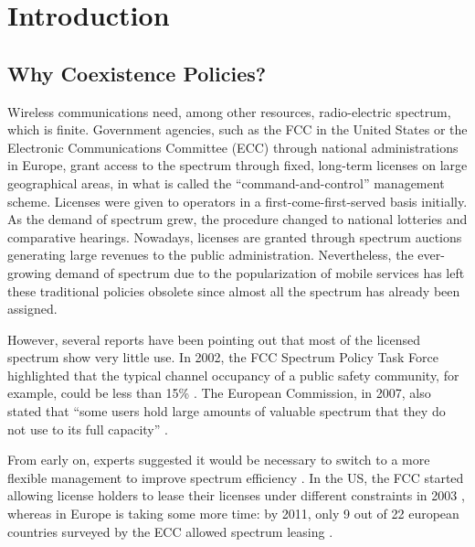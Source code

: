 \graphicspath{ {img/SPEC_MAN/} }
\chapter{Introduction}
\section{Why Coexistence Policies?}
Wireless communications need, among other resources, radio-electric spectrum, which is finite. 
Government agencies, such as the FCC in the United States or the Electronic Communications Committee (ECC) through national administrations in Europe, grant access to the spectrum through fixed, long-term licenses on large geographical areas, in what is called the \enquote{command-and-control} management scheme. 
Licenses were given to operators in a first-come-first-served basis initially. As the demand of spectrum grew, the procedure changed to national lotteries and comparative hearings. Nowadays, licenses are granted through spectrum auctions generating large revenues to the public administration. %
Nevertheless, the ever-growing demand of spectrum due to the popularization of mobile services has left these traditional policies obsolete since almost all the spectrum has already been assigned. %

However, several reports have been pointing out that most of the licensed spectrum show very little use. In 2002, the FCC Spectrum Policy Task Force highlighted that the typical channel occupancy of a public safety community, for example, could be less than 15\% \cite{ref:FCC2002}. The European Commission, in 2007, also stated that \enquote{some users hold large amounts of valuable spectrum that they do not use to its full capacity} \cite{ref:Commission2007}.

From early on, experts suggested it would be necessary to switch to a more flexible management to improve spectrum efficiency \cite{ref:Valletti2001}. In the US, the FCC started allowing license holders to lease their licenses under different constraints in 2003 \cite{ref:Mayo2010}, whereas in Europe is taking some more time: by 2011, only 9 out of 22 european countries surveyed by the ECC allowed spectrum leasing \cite{ref:ECC2011}. %

